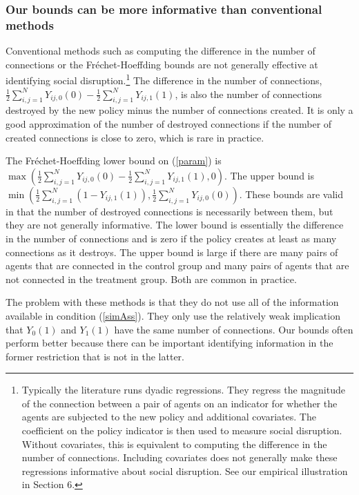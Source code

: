 \documentclass[12pt]{article}
\theoremstyle{definition}
\begin{document}
\subsubsection{Our bounds can be more informative than conventional methods}
Conventional methods such as computing the difference in the number of connections or the Fr\'echet-Hoeffding bounds are not generally effective at identifying social disruption.\footnote{Typically the literature runs dyadic regressions. They regress the magnitude of the connection between a pair of agents on an indicator for whether the agents are subjected to the new policy and additional covariates. The coefficient on the policy indicator is then used to measure social disruption. Without covariates, this is equivalent to computing the difference in the number of connections. Including covariates does not generally make these regressions informative about social disruption. See our empirical illustration in Section 6.} The difference in the number of connections, $\frac{1}{2}\sum_{i,j = 1}^{N}Y_{ij,0}(0) - \frac{1}{2}\sum_{i,j = 1}^{N}Y_{ij,1}(1)$, is also the number of connections destroyed by the new policy minus the number of connections created. It is only a good approximation of the number of destroyed connections if the number of created connections is close to zero, which is rare in practice.   

The Fr\'echet-Hoeffding  lower bound on (\ref{param}) is $\max(\frac{1}{2}\sum_{i,j=1}^{N}Y_{ij,0}(0)- \frac{1}{2}\sum_{i,j=1}^{N}Y_{ij,1}(1),0)$. The upper bound is $\min(\frac{1}{2}\sum_{i,j=1}^{N}(1-Y_{ij,1}(1)),\frac{1}{2}\sum_{i,j=1}^{N}Y_{ij,0}(0))$. These bounds are valid in that the number of destroyed connections is necessarily between them, but they are not generally informative. The lower bound is essentially the difference in the number of connections and is zero if the policy creates at least as many connections as it destroys. The upper bound is large if there are many pairs of agents that are connected in the control group and many pairs of agents that are not connected in the treatment group. Both are common in practice.   

The problem with these methods is that they do not use all of the information available in condition (\ref{simAss}). They only use the relatively weak implication that $Y_{0}(1)$ and $Y_{1}(1)$ have the same number of connections. Our bounds often perform better because there can be important identifying information in the former restriction that is not in the latter.   
\end{document}
